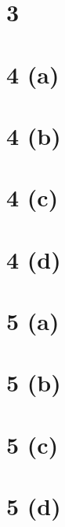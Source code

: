 \documentclass[10pt]{article}
\begin{document}
\section*{3}

\section*{4 (a)}
\section*{4 (b)}
\section*{4 (c)}
\section*{4 (d)}

\section*{5 (a)}
\section*{5 (b)}
\section*{5 (c)}
\section*{5 (d)}
\end{document}
